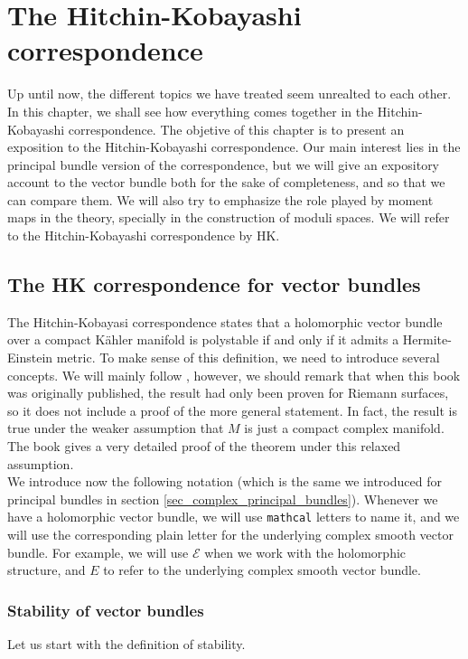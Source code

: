 \chapter{The Hitchin-Kobayashi correspondence} \label{chapter_HK_correspondence}
Up until now, the different topics we have treated seem unrealted to each other. In this chapter, we shall see how everything comes together in the Hitchin-Kobayashi correspondence. The objetive of this chapter is to present an exposition to the Hitchin-Kobayashi correspondence. Our main interest lies in the principal bundle version of the correspondence, but we will give an expository account to the vector bundle both for the sake of completeness, and so that we can compare them. We will also try to emphasize the role played by moment maps in the theory, specially in the construction of moduli spaces. We will refer to the Hitchin-Kobayashi correspondence by HK. 

\section{The HK correspondence for vector bundles}
The Hitchin-Kobayasi correspondence states that a holomorphic vector bundle over a compact Kähler manifold is polystable if and only if it admits a Hermite-Einstein metric. To make sense of this definition, we need to introduce several concepts. We will mainly follow \parencite{kobayashi_complex_vector_bundles}, however, we should remark that when this book was originally published, the result had only been proven for Riemann surfaces, so it does not include a proof of the more general statement. In fact, the result is true under the weaker assumption that \(M\) is just a compact complex manifold. The book \parencite{teleman} gives a very detailed proof of the theorem under this relaxed assumption. \\

We introduce now the following notation (which is the same we introduced for principal bundles in section \ref{sec_complex_principal_bundles}). Whenever we have a holomorphic vector bundle, we will use \texttt{mathcal} letters to name it, and we will use the corresponding plain letter for the underlying complex smooth vector bundle. For example, we will use \(\mathcal{E}\) when we work with the holomorphic structure, and \(E\) to refer to the underlying complex smooth vector bundle.

\subsection{Stability of vector bundles}
Let us start with the definition of stability.

